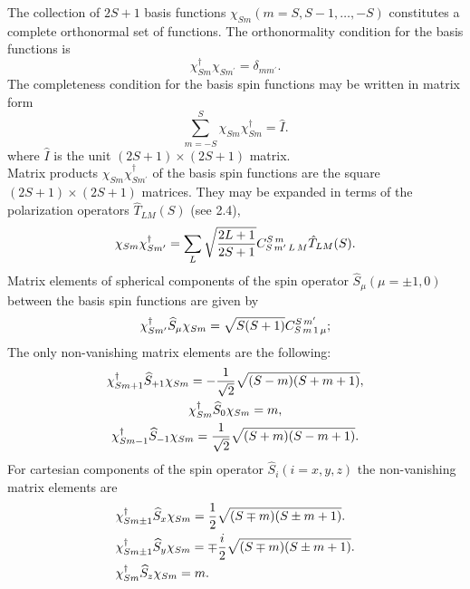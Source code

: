 The collection of $2 S+1$ basis functions $\chi_{S m}(m=S, S-1, \ldots,-S)$ constitutes a complete orthonormal set of functions. The orthonormality condition for the basis functions is
\begin{equation}
\chi_{S m}^{\dagger} \chi_{S m^{\prime}}=\delta_{m m^{\prime}} . \label{eq:6:1:9}
\end{equation}
The completeness condition for the basis spin functions may be written in matrix form
\begin{equation}
\sum_{m=-S}^{S} \chi_{S m} \chi_{S m}^{\dagger}=\widehat{I} . \label{eq:6:1:10}
\end{equation}
where $\widehat{I}$ is the unit $(2 S+1) \times(2 S+1)$ matrix.\\
Matrix products $\chi_{S m} \chi_{S m^{\prime}}^{\dagger}$ of the basis spin functions are the square $(2 S+1) \times(2 S+1)$ matrices. They may be expanded in terms of the polarization operators $\widehat{T}_{L M}(S)$ (see 2.4),
\begin{equation}
\chi_{S m} \chi_{S m^{\prime}}^{\dagger}=\sum_{L} \sqrt{\frac{2 L+1}{2 S+1}} C_{S\,m^{\prime}\,L\,M}^{S\,m} \hat{T}_{L M}(S) . \label{eq:6:1:11}
\end{equation}
Matrix elements of spherical components of the spin operator $\widehat{S}_{\mu}(\mu= \pm 1,0)$ between the basis spin functions are given by
\begin{equation}
\chi_{S m^{\prime}}^{\dagger} \widehat{S}_{\mu} \chi_{S m}=\sqrt{S(S+1)} C_{S\,m\,1\,\mu}^{S\,m^{\prime}} ; \label{eq:6:1:12}
\end{equation}
The only non-vanishing matrix elements are the following:
\begin{gather}
\chi_{S m+1}^{\dagger} \widehat{S}_{+1} \chi_{S m}=-\frac{1}{\sqrt{2}} \sqrt{(S-m)(S+m+1)} , \notag\\
\chi_{S m}^{\dagger} \widehat{S}_{0} \chi_{S m}=m , \label{eq:6:1:13}\\
\chi_{S m-1}^{\dagger} \widehat{S}_{-1} \chi_{S m}=\frac{1}{\sqrt{2}} \sqrt{(S+m)(S-m+1)}. \notag
\end{gather}
For cartesian components of the spin operator $\widehat{S}_{i}(i=x, y, z)$ the non-vanishing matrix elements are
\begin{align}
& \chi_{S m \pm 1}^{\dagger} \widehat{S}_{x} \chi_{S m}=\frac{1}{2} \sqrt{(S \mp m)(S \pm m+1)}. \notag\\
& \chi_{S m \pm 1}^{\dagger} \widehat{S}_{y} \chi_{S m}=\mp \frac{i}{2} \sqrt{(S \mp m)(S \pm m+1)}. \label{eq:6:1:14}\\
& \chi_{S m}^{\dagger} \widehat{S}_{z} \chi_{S m}=m. \notag
\end{align}
